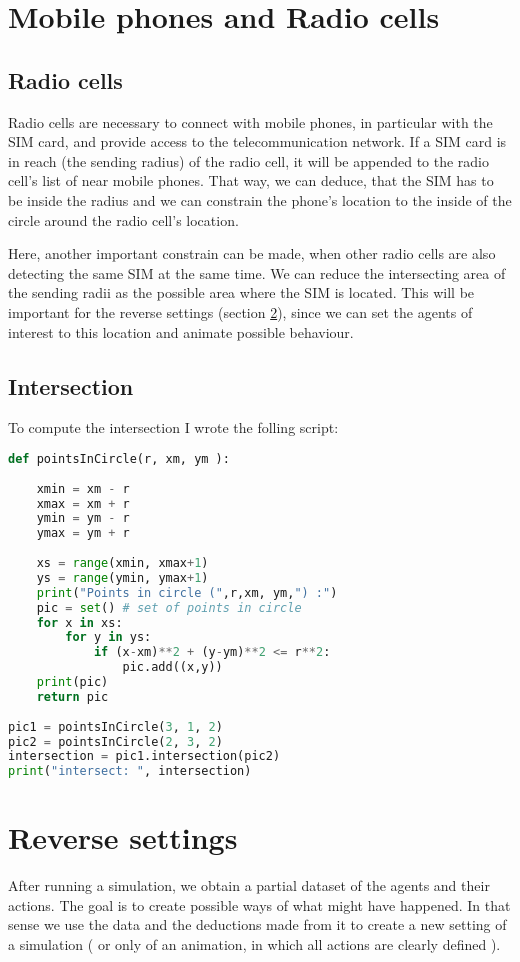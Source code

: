\documentclass[11pt,a4paper]{article}
\begin{document}
\section{Mobile phones and Radio cells}
\subsection{Radio cells}
Radio cells are necessary to connect with mobile phones, in particular with the SIM card, and provide access to the telecommunication network. If a SIM card is in reach (the sending radius) of the radio cell, it will be appended to the radio cell's list of near mobile phones. That way, we can deduce, that the SIM has to be inside the radius and we can constrain the phone's location to the inside of the circle around the radio cell's location.

Here, another important constrain can be made, when other radio cells are also detecting the same SIM at the same time. We can reduce the intersecting area of the sending radii as the possible area where the SIM is located. 
This will be important for the reverse settings (section \ref{sec:reverse}), since we can set the agents of interest to this location and animate possible behaviour.

\subsection{Intersection}
To compute the intersection I wrote the folling script:

\begin{lstlisting}[language = Python, caption={Intersection of circles}]
def pointsInCircle(r, xm, ym ):
    
    xmin = xm - r
    xmax = xm + r
    ymin = ym - r
    ymax = ym + r
    
    xs = range(xmin, xmax+1)
    ys = range(ymin, ymax+1)
    print("Points in circle (",r,xm, ym,") :")
    pic = set() # set of points in circle
    for x in xs:
        for y in ys:
            if (x-xm)**2 + (y-ym)**2 <= r**2:
                pic.add((x,y))
    print(pic)
    return pic
                       
pic1 = pointsInCircle(3, 1, 2)        
pic2 = pointsInCircle(2, 3, 2) 
intersection = pic1.intersection(pic2)   
print("intersect: ", intersection)
\end{lstlisting}

\section{Reverse settings}
\label{sec:reverse}
After running a simulation, we obtain a partial dataset of the agents and their actions. The goal is to create possible ways of what might have happened. In that sense we use the data and  the deductions made from it to create a new setting of a simulation ( or only of an animation, in which all actions are clearly defined ).
\end{document}
